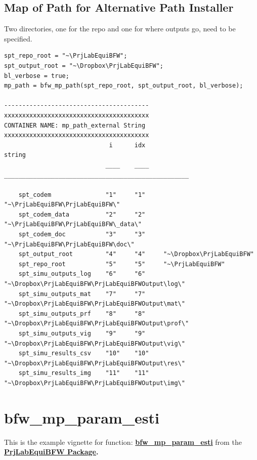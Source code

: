 \documentclass[
]{book}
\begin{document}
\hypertarget{map-of-path-for-alternative-path-installer}{%
\subsection{Map of Path for Alternative Path Installer}\label{map-of-path-for-alternative-path-installer}}

Two directories, one for the repo and one for where outputs go, need to
be specified.

\begin{verbatim}
spt_repo_root = "~\PrjLabEquiBFW";
spt_output_root = "~\Dropbox\PrjLabEquiBFW";
bl_verbose = true;
mp_path = bfw_mp_path(spt_repo_root, spt_output_root, bl_verbose);

----------------------------------------
xxxxxxxxxxxxxxxxxxxxxxxxxxxxxxxxxxxxxxxx
CONTAINER NAME: mp_path_external String
xxxxxxxxxxxxxxxxxxxxxxxxxxxxxxxxxxxxxxxx
                             i      idx                           string                       
                            ____    ____    ___________________________________________________

    spt_codem               "1"     "1"     "~\PrjLabEquiBFW\PrjLabEquiBFW\"                   
    spt_codem_data          "2"     "2"     "~\PrjLabEquiBFW\PrjLabEquiBFW\_data\"             
    spt_codem_doc           "3"     "3"     "~\PrjLabEquiBFW\PrjLabEquiBFW\doc\"               
    spt_output_root         "4"     "4"     "~\Dropbox\PrjLabEquiBFW"                          
    spt_repo_root           "5"     "5"     "~\PrjLabEquiBFW"                                  
    spt_simu_outputs_log    "6"     "6"     "~\Dropbox\PrjLabEquiBFW\PrjLabEquiBFWOutput\log\" 
    spt_simu_outputs_mat    "7"     "7"     "~\Dropbox\PrjLabEquiBFW\PrjLabEquiBFWOutput\mat\" 
    spt_simu_outputs_prf    "8"     "8"     "~\Dropbox\PrjLabEquiBFW\PrjLabEquiBFWOutput\prof\"
    spt_simu_outputs_vig    "9"     "9"     "~\Dropbox\PrjLabEquiBFW\PrjLabEquiBFWOutput\vig\" 
    spt_simu_results_csv    "10"    "10"    "~\Dropbox\PrjLabEquiBFW\PrjLabEquiBFWOutput\res\" 
    spt_simu_results_img    "11"    "11"    "~\Dropbox\PrjLabEquiBFW\PrjLabEquiBFWOutput\img\" 
\end{verbatim}

\hypertarget{bfw_mp_param_esti}{%
\section{bfw\_mp\_param\_esti}\label{bfw_mp_param_esti}}

This is the example vignette for function:
\href{https://github.com/FanWangEcon/PrjLabEquiBFW/tree/main/PrjLabEquiBFW/params/bfw_mp_param_esti.m}{\textbf{bfw\_mp\_param\_esti}}
from the \href{https://fanwangecon.github.io/PrjLabEquiBFW/}{\textbf{PrjLabEquiBFW
Package}}\textbf{.}
\end{document}
